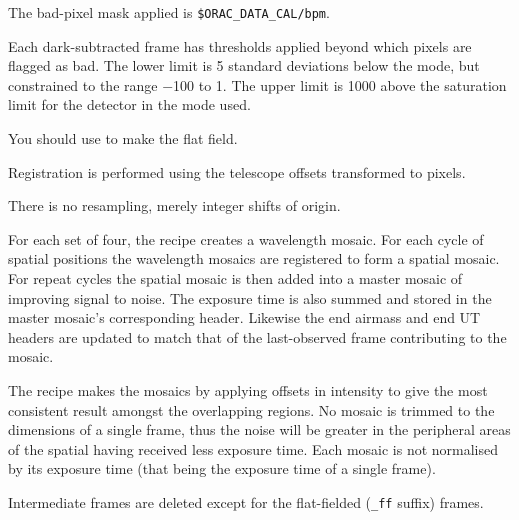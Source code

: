 \documentclass[twoside,11pt,nolof]{starlink}
\begin{document}
{{{         \sstitem
         The bad-pixel mask applied is {\tt\$ORAC\_DATA\_CAL/bpm}.

         \sstitem
         Each dark-subtracted frame has thresholds applied beyond which
         pixels are flagged as bad.  The lower limit is 5 standard
         deviations below the mode, but constrained to the range $-$100 to 1.
         The upper limit is 1000 above the saturation limit for the detector
         in the mode used.

         \sstitem
         You should use  to make the flat field.

         \sstitem
         Registration is performed using the telescope offsets
         transformed to pixels.

         \sstitem
         There is no resampling, merely integer shifts of origin.

         \sstitem
         For each set of four, the recipe creates a wavelength mosaic.
         For each cycle of spatial positions the wavelength mosaics are
         registered to form a spatial mosaic.  For repeat cycles the spatial
         mosaic is then added into a master mosaic of improving signal to
         noise.  The exposure time is also summed and stored in the master
         mosaic's corresponding header. Likewise the end airmass and end
         UT headers are updated to match that of the last-observed frame
         contributing to the mosaic.

         \sstitem
         The recipe makes the mosaics by applying offsets in intensity
         to give the most consistent result amongst the overlapping regions.
         No mosaic is trimmed to the dimensions of a single frame, thus the
         noise will be greater in the peripheral areas of the spatial having
         received less exposure time.  Each mosaic is not normalised by its
         exposure time (that being the exposure time of a single frame).

         \sstitem
         Intermediate frames are deleted except for the flat-fielded ({\tt\_ff}
         suffix) frames.
      }
   }
   }
\end{document}
